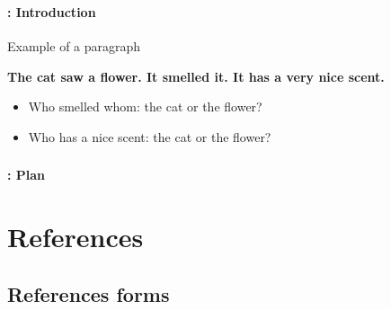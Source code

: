 \documentclass[xcolor=table]{beamer}
\subtitle[09- Coreference resolution]{Chapter 09\\Coreference resolution}
\begin{document}
	
\begin{frame}
	\frametitle{\inserttitle}
	\framesubtitle{\insertshortsubtitle: Introduction}

	\begin{exampleblock}{Example of a paragraph}
		\begin{center}
			\Large\bfseries
		The cat saw a flower. \textbf{\color{red}It} smelled \textbf{\color{red}it}. \textbf{\color{red}It} has a very nice scent.
		\end{center}
	\end{exampleblock}
	
	\begin{itemize}
		\item Who smelled whom: the cat or the flower?
		\item Who has a nice scent: the cat or the flower?
	\end{itemize}

\end{frame}


\begin{frame}
	\frametitle{\inserttitle}
	\framesubtitle{\insertshortsubtitle: Plan}

	\begin{multicols}{2}
	\tableofcontents
	\end{multicols}

\end{frame}

\section{References}

\begin{frame}
	\frametitle{\insertshortsubtitle}
	\framesubtitle{\insertsection}
	
\end{frame}

\subsection{References forms}
\end{document}
